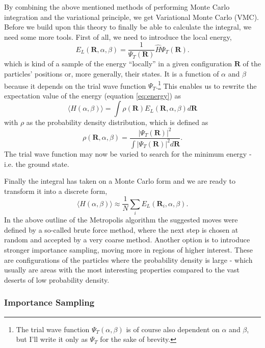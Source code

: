 \documentclass[aps,prb,twocolumn,floatfix]{revtex4}
\renewcommand{\vec}{\mathbf}
\begin{document}
By combining the above mentioned methods of performing Monte Carlo integration and the variational principle, we get Variational Monte Carlo (VMC). Before we build upon this theory to finally be able to calculate the integral, we need some more tools. First of all, we need to introduce the local energy,
\begin{equation}
    E_L(\vec R,\alpha,\beta) = \frac{1}{\Psi_T(\vec R)} \hat H \Psi_T(\vec R).
\end{equation}
which is kind of a sample of the energy ``locally'' in a given configuration $\vec R$ of the particles' positions or, more generally, their states. It is a function of $\alpha$ and $\beta$ because it depends on the trial wave function $\Psi_T$.\footnote{The trial wave function $\Psi_T(\alpha, \beta)$ is of course also dependent on $\alpha$ and $\beta$, but I'll write it only as $\Psi_T$ for the sake of brevity.} This enables us to rewrite the expectation value of the energy (equation \ref{eq:energy}) as
\begin{equation}
    \langle H(\alpha,\beta) \rangle = \int \rho(\vec R) E_L(\vec R,\alpha,\beta) d\vec R
\end{equation}
with $\rho$ as the probability density distribution, which is defined as
\begin{equation}
    \rho (\vec R,\alpha,\beta) = \frac{|\Psi_T(\vec R)|^2}{\int |\Psi_T(\vec R)|^2 d\vec R}.
\end{equation}
The trial wave function may now be varied to search for the minimum energy - i.e. the ground state.

Finally the integral has taken on a Monte Carlo form and we are ready to transform it into a discrete form,
\begin{equation}
    \langle H(\alpha, \beta) \rangle \approx \frac{1}{N} \sum_i E_L (\vec R_i,\alpha,\beta).
\end{equation}
In the above outline of the Metropolis algorithm the suggested moves were defined by a so-called brute force method, where the next step is chosen at random and accepted by a very coarse method. Another option is to introduce stronger importance sampling, moving more in regions of higher interest. These are configurations of the particles where the probability density is large - which usually are areas with the most interesting properties compared to the vast deserts of low probability density.

\subsubsection{Importance Sampling}
\end{document}

